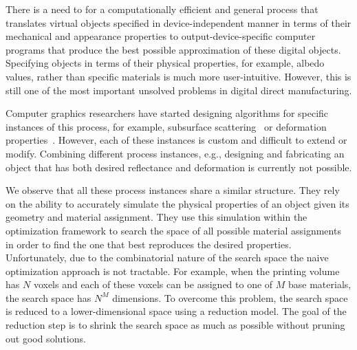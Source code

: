 \documentclass[annual]{acmsiggraph}
\begin{document}
There is a need to for a computationally efficient and general process that translates virtual objects specified in device-independent manner in terms of their mechanical and appearance properties to output-device-specific computer programs that produce the best possible approximation of these digital objects.
Specifying objects in terms of their physical properties, for example, albedo values, rather than specific materials is much more user-intuitive.  However, this is still one of the most important unsolved problems in digital direct manufacturing.

Computer graphics researchers have started designing algorithms for specific instances of this process, for example, subsurface scattering~\cite{Hasan:2010,Dong:2010} or deformation properties~\cite{Bickel:2010}. However, each of these instances is custom and difficult to extend or modify. Combining different process instances, e.g., designing and fabricating an object that has both desired reflectance and deformation is currently not possible.

We observe that all these process instances share a similar structure. They rely on the ability to accurately simulate the physical properties of an object given its geometry and material assignment. They use this simulation within the optimization framework to search the space of all possible material assignments in order to find the one that best reproduces the desired properties. Unfortunately, due to the combinatorial nature of the search space the naive optimization approach is not tractable. For example, when the printing volume has $N$ voxels and each of these voxels can be assigned to one of $M$ base materials, the search space has $N^M$ dimensions. To overcome this problem, the search space is reduced to a lower-dimensional space using a reduction model. The goal of the reduction step is to shrink the search space as much as possible without pruning out good solutions.
\end{document}
